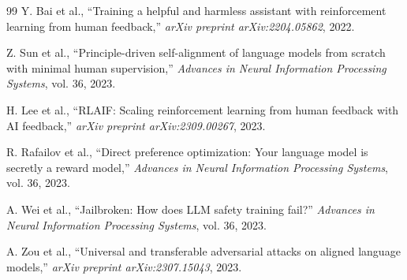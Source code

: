 \documentclass[conference]{IEEEtran}
\begin{document}
\begin{thebibliography}{99}
Y. Bai et al., ``Training a helpful and harmless assistant with reinforcement learning from human feedback,'' \textit{arXiv preprint arXiv:2204.05862}, 2022.

Z. Sun et al., ``Principle-driven self-alignment of language models from scratch with minimal human supervision,'' \textit{Advances in Neural Information Processing Systems}, vol. 36, 2023.

H. Lee et al., ``RLAIF: Scaling reinforcement learning from human feedback with AI feedback,'' \textit{arXiv preprint arXiv:2309.00267}, 2023.

R. Rafailov et al., ``Direct preference optimization: Your language model is secretly a reward model,'' \textit{Advances in Neural Information Processing Systems}, vol. 36, 2023.

A. Wei et al., ``Jailbroken: How does LLM safety training fail?'' \textit{Advances in Neural Information Processing Systems}, vol. 36, 2023.

A. Zou et al., ``Universal and transferable adversarial attacks on aligned language models,'' \textit{arXiv preprint arXiv:2307.15043}, 2023.

\end{thebibliography}
\end{document}
